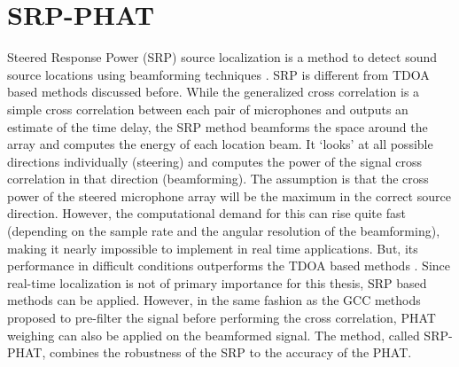 \section{SRP-PHAT}\label{sec:SRP}
Steered Response Power (SRP) source localization is a method to detect sound source locations using beamforming techniques \cite{krim1996two}. SRP is different from TDOA based methods discussed before. While the generalized cross correlation is a simple cross correlation between each pair of microphones and outputs an estimate of the time delay, the SRP method beamforms the space around the array and computes the energy of each location beam.  It `looks' at all possible directions individually (steering) and computes the power of the signal cross correlation in that direction (beamforming). The assumption is that the cross power of the steered microphone array will be the maximum in the correct source direction. However, the computational demand for this can rise quite fast (depending on the sample rate and the angular resolution of the beamforming), making it nearly impossible to implement in real time applications. But, its performance in difficult conditions outperforms the TDOA based methods \cite{dmochowski2007generalized}. Since real-time localization is not of primary importance for this thesis, SRP based methods can be applied. However, in the same fashion as the GCC methods proposed to pre-filter the signal before performing the cross correlation, PHAT weighing can also be applied on the beamformed signal. The method, called SRP-PHAT, combines the robustness of the SRP to the accuracy of the PHAT. 
